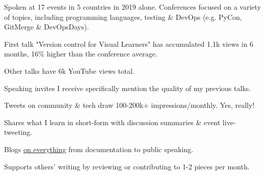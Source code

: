 \documentclass[letterpaper]{deedy-resume} %
\begin{document}
\begin{minipage}[t]{0.66\textwidth}

\vspace{\topsep} %
\begin{tightitemize}
\item Spoken at 17 events in 5 countries in 2019 alone. Conferences focused on a variety of topics, including programming languages, testing \& DevOps (e.g. PyCon, GitMerge \& DevOpsDays).
\item First talk "Version control for Visual Learners" has accumulated 1.1k views in 6 months, 16\% higher than the conference average.
\item Other talks have 6k YouTube views total.
\item Speaking invites I receive specifically mention the quality of my previous talks.
\end{tightitemize}

\sectionspace %


\begin{tightitemize}
\item Tweets on community \& tech draw 100-200k+ impressions/monthly. Yes, really!
\item Shares what I learn in short-form with discussion summaries \& event live-tweeting.
\end{tightitemize}

\sectionspace %


\begin{tightitemize}
\item Blogs \href{}{on everything} from documentation to public speaking.
\item Supports others' writing by reviewing or contributing to 1-2 pieces per month.
\end{tightitemize}


\end{minipage}
\end{document}
